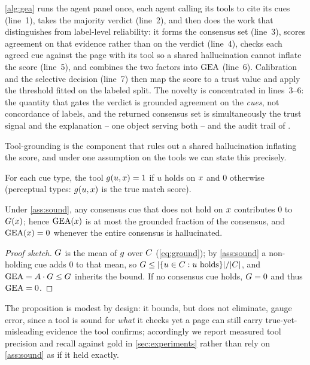 \autoref{alg:gea} runs the agent panel once, each agent calling its tools to cite its
cues (line~1), takes the majority verdict (line~2), and then does the work that
distinguishes \toolname{} from label-level reliability: it forms the consensus set
(line~3), scores agreement on that evidence rather than on the verdict (line~4),
checks each agreed cue against the page with its tool so a shared hallucination cannot
inflate the score (line~5), and combines the two factors into $\mathrm{GEA}$ (line~6).
Calibration and the selective decision (line~7) then map the score to a trust value and
apply the threshold fitted on the labeled split. The novelty is concentrated in
lines~3--6: the quantity that gates the verdict is grounded agreement on the
\emph{cues}, not concordance of labels, and the returned consensus set is
simultaneously the trust signal and the explanation -- one object serving both
-- and the audit trail of .

Tool-grounding is the component that rules out a shared hallucination inflating the
score, and under one assumption on the tools we can state this precisely.
\begin{assumption}\label{ass:sound}
For each cue type, the tool $g(u,x)=1$ if $u$ holds on $x$ and $0$
otherwise (perceptual types: $g(u,x)$ is the true match score).
\end{assumption}
\begin{proposition}\label{prop:hall}
Under \autoref{ass:sound}, any consensus cue that does not hold on $x$
contributes $0$ to $G(x)$; hence $\mathrm{GEA}(x)$ is at most the grounded
fraction of the consensus, and $\mathrm{GEA}(x)=0$ whenever the entire consensus
is hallucinated.
\end{proposition}
\begin{proof}[Proof sketch]
$G$ is the mean of $g$ over $C$ (\eqref{eq:ground}); by
\autoref{ass:sound} a non-holding cue adds $0$ to that mean, so
$G\le\lvert\{u\in C: u\text{ holds}\}\rvert/\lvert C\rvert$, and
$\mathrm{GEA}=A\cdot G\le G$ inherits the bound. If no consensus cue holds,
$G=0$ and thus $\mathrm{GEA}=0$.
\end{proof}
The proposition is modest by design: it bounds, but does not eliminate, gauge error,
since a tool is sound for \emph{what} it checks yet a page can still carry
true-yet-misleading evidence the tool confirms; accordingly we report measured tool
precision and recall against gold in \autoref{sec:experiments} rather than rely on
\autoref{ass:sound} as if it held exactly.

